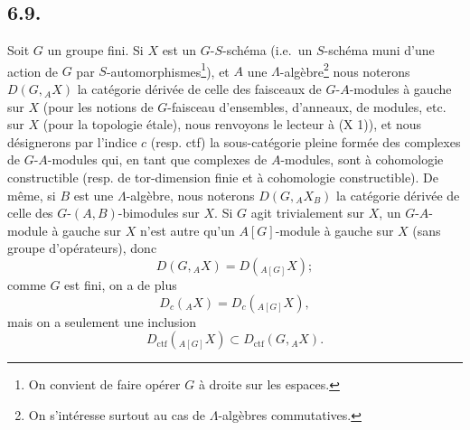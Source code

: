 \subsection*{6.9.}
Soit $G$ un groupe fini. Si $X$ est un $G$-$S$-schéma (i.e.~un $S$-schéma muni d'une action de $G$ par $S$-automorphismes\footnote{On convient de faire opérer $G$ à droite sur les espaces.}), et $A$ une $\Lambda$-algèbre\footnote{On s'intéresse surtout au cas de $\Lambda$-algèbres commutatives.} nous noterons $D(G,{}_AX)$ la catégorie dérivée de celle des faisceaux de $G$-$A$-modules à gauche sur $X$ (pour les notions de $G$-faisceau d'ensembles, d'anneaux, de modules, etc. sur $X$ (pour la topologie étale), nous renvoyons le lecteur à (X 1)), et nous
désignerons par l'indice $c$ (resp. ctf) la sous-catégorie pleine formée des complexes de $G$-$A$-modules qui, en tant que complexes de $A$-modules, sont à cohomologie constructible (resp. de tor-dimension finie et à cohomologie constructible). De même, si $B$ est une $\Lambda$-algèbre, nous noterons $D(G,{}_AX_B)$ la catégorie dérivée de celle des $G$-$(A,B)$-bimodules sur $X$. Si $G$ agit trivialement sur $X$, un $G$-$A$-module à gauche sur $X$ n'est autre qu'un $A[G]$-module à gauche sur $X$ (sans groupe d'opérateurs), donc
\[
D(G,{}_AX)=D({}_{A[G]}X);
\]
comme $G$ est fini, on a de plus
\[
D_c({}_AX)=D_c({}_{A[G]}X),
\]
mais on a seulement une inclusion
\[
D_{\mathrm{ctf}}({}_{A[G]}X)\subset D_{\mathrm{ctf}}(G,{}_AX).
\]

